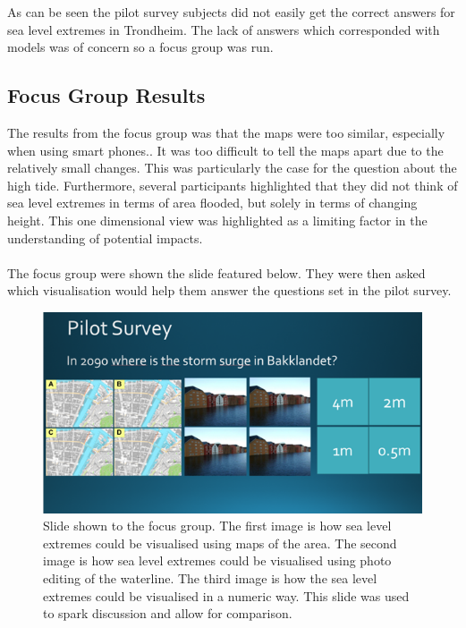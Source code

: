 As can be seen the pilot survey subjects did not easily get the correct answers for sea level extremes in Trondheim. The lack of answers which corresponded with models was of concern so a focus group was run. 
\paragraph{}


\subsection{Focus Group Results}
 The results from the focus group was that the maps were too similar, especially when using smart phones.. It was too difficult to tell the maps apart due to the relatively small changes. This was particularly the case for the question about the high tide. Furthermore, several participants highlighted that they did not think of sea level extremes in terms of area flooded, but solely in terms of changing height. This one dimensional view was highlighted as a limiting factor in the understanding of potential impacts. 
\paragraph{}

The focus group were shown the slide featured below. They were then asked which visualisation would help them answer the questions set in the pilot survey.
\begin{figure}[h!]
    \centering
    \includegraphics[width=1\textwidth]{fig_results/slide-pilot-survey.png}
    \caption{Slide shown to the focus group. The first image is how sea level extremes could be visualised using maps of the area. The second image is how sea level extremes could be visualised using photo editing of the waterline. The third image is how the sea level extremes could be visualised in a numeric way. This slide was used to spark discussion and allow for comparison.}
    \label{fig:slide}
\end{figure}

